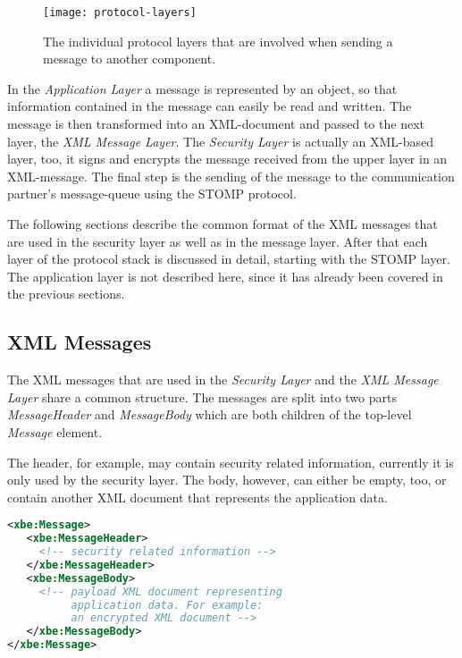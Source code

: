 \begin{figure}[ht]
  \centering
  \texttt{[image: protocol-layers]}
  \caption[Protocol  Layers]{The  individual   protocol  layers  that  are
    involved when sending a message to another component.}
  \label{fig:communication-layers}
\end{figure}

In the \emph{Application Layer} a  message is represented by an object, so
that information contained in the  message can easily be read and written.
The message  is then  transformed into an  XML-document and passed  to the
next layer, \ie the \emph{XML Message Layer}. The \emph{Security Layer} is
actually  an XML-based  layer,  too,  it signs  and  encrypts the  message
received from  the upper layer in  an XML-message.  The final  step is the
sending of the message  to the communication partner's message-queue using
the STOMP protocol.

\medskip

The following sections describe the common format of the XML messages that
are used in the security layer as well as in the message layer. After that
each layer of the protocol stack is discussed in detail, starting with the
STOMP layer.  The application  layer is not  described here, since  it has
already been covered in the previous sections.

\subsection{XML Messages}

The  XML messages  that  are used  in  the \emph{Security  Layer} and  the
\emph{XML Message Layer} share a  common structure. The messages are split
into two parts \emph{MessageHeader}  and \emph{MessageBody} which are both
children of the top-level \emph{Message} element.

The  header,  for  example,  may  contain  security  related  information,
currently it is  only used by the security layer.   The body, however, can
either be empty, too, or  contain another XML document that represents the
application data.

\medskip
\begin{center}
  \begin{minipage}{.75\textwidth}
    \begin{lstlisting}[captionpos=b,backgroundcolor=\color{listingcolor},frame=lines,numbers=none,stepnumber=5,numberfirstline=false,numberstyle=\tiny,caption={The
        structure of an XML message.},label={lst:xml-message-example},language=XML]
<xbe:Message>
   <xbe:MessageHeader>
     <!-- security related information -->
   </xbe:MessageHeader>
   <xbe:MessageBody>
     <!-- payload XML document representing
          application data. For example:
          an encrypted XML document -->
   </xbe:MessageBody>
</xbe:Message>
    \end{lstlisting}
  \end{minipage}
\end{center}

